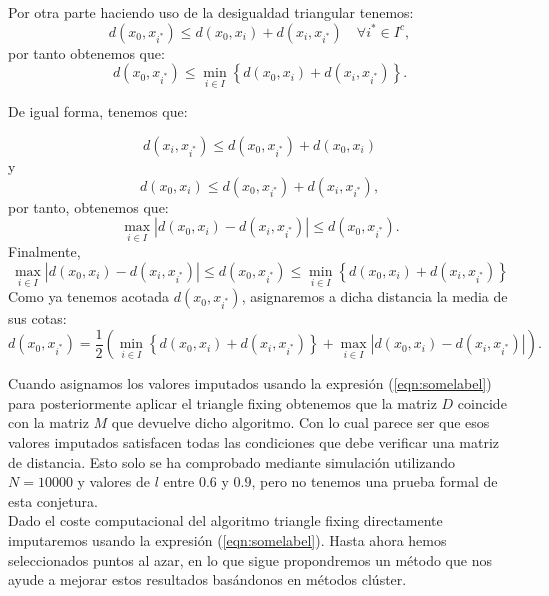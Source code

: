 \documentclass[12pt]{report} %
\theoremstyle{definition}
\begin{document}
{Por otra parte haciendo uso de la desigualdad triangular tenemos:
\begin{equation}
d(x_0,x_{i^*}) \leq d(x_0,x_i) + d(x_i,x_{i^*}) \quad \forall i^* \in I^c,
\end{equation}
\indent por tanto obtenemos que:
\begin{equation}
d(x_0,x_{i^*}) \leq \min_{i \in I} \left\lbrace d(x_0,x_i) + d(x_i,x_{i^*}) \right\rbrace . 
\end{equation}

De igual forma, tenemos que:

\begin{equation}
d(x_i,x_{i^*}) \leq d(x_0,x_{i^*}) + d(x_0,x_{i})
\end{equation}
\noindent y
\begin{equation}
d(x_0,x_{i}) \leq d(x_0,x_{i^*}) + d(x_i,x_{i^*}),
\end{equation}
\noindent por tanto, obtenemos que:
\begin{equation}
\max_{i \in I} \left| d(x_0,x_{i}) - d(x_i,x_{i^*}) \right| \leq d(x_0,x_{i^*}).
\end{equation}
\noindent Finalmente,
\begin{equation}
\max_{i \in I} \left| d(x_0,x_{i}) - d(x_i,x_{i^*}) \right| \leq d(x_0,x_{i^*}) \leq  \min_{i \in I} \left\lbrace d(x_0,x_i) + d(x_i,x_{i^*}) \right\rbrace
\end{equation}
Como ya tenemos acotada $d(x_0,x_{i^*})$, asignaremos a dicha distancia la media de sus cotas:
\begin{equation}\label{eqn:somelabel}
d(x_0,x_{i^*}) = \dfrac{1}{2} \left( \min_{i \in I} \left\lbrace d(x_0,x_i) + d(x_i,x_{i^*}) \right\rbrace + \max_{i \in I} \left| d(x_0,x_{i}) - d(x_i,x_{i^*}) \right| \right).
\end{equation}

Cuando asignamos los valores imputados usando la expresión (\ref{eqn:somelabel}) para posteriormente aplicar el triangle fixing obtenemos que la matriz $D$ coincide con la matriz $M$ que devuelve dicho algoritmo. Con lo cual parece ser que esos valores imputados satisfacen todas las condiciones que debe verificar una matriz de distancia. Esto solo se ha comprobado mediante simulación utilizando $N=10000$ y valores de $l$ entre $0.6$ y $0.9$, pero no tenemos una prueba formal de esta conjetura.\\

Dado el coste computacional del algoritmo triangle fixing directamente imputaremos usando la expresión (\ref{eqn:somelabel}). Hasta ahora hemos seleccionados puntos al azar, en lo que sigue propondremos un método que nos ayude a mejorar estos resultados basándonos en métodos clúster.

}
\end{document}
